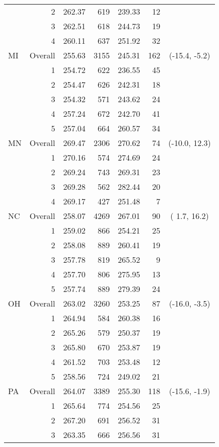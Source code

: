 \begin{longtable}{lrrr@{\extracolsep{.25cm}}rrc}
   & 2 & 262.37 & 619 & 239.33 &  12 &  \\ 
   & 3 & 262.51 & 618 & 244.73 &  19 &  \\ 
   & 4 & 260.11 & 637 & 251.92 &  32 &  \\ 
   \hline
MI & Overall & 255.63 & 3155 & 245.31 & 162 & (-15.4,  -5.2) \\ 
   & 1 & 254.72 & 622 & 236.55 &  45 &  \\ 
   & 2 & 254.47 & 626 & 242.31 &  18 &  \\ 
   & 3 & 254.32 & 571 & 243.62 &  24 &  \\ 
   & 4 & 257.24 & 672 & 242.70 &  41 &  \\ 
   & 5 & 257.04 & 664 & 260.57 &  34 &  \\ 
   \hline
MN & Overall & 269.47 & 2306 & 270.62 &  74 & (-10.0,  12.3) \\ 
   & 1 & 270.16 & 574 & 274.69 &  24 &  \\ 
   & 2 & 269.24 & 743 & 269.31 &  23 &  \\ 
   & 3 & 269.28 & 562 & 282.44 &  20 &  \\ 
   & 4 & 269.17 & 427 & 251.48 &   7 &  \\ 
   \hline
NC & Overall & 258.07 & 4269 & 267.01 &  90 & (  1.7,  16.2) \\ 
   & 1 & 259.02 & 866 & 254.21 &  25 &  \\ 
   & 2 & 258.08 & 889 & 260.41 &  19 &  \\ 
   & 3 & 257.78 & 819 & 265.52 &   9 &  \\ 
   & 4 & 257.70 & 806 & 275.95 &  13 &  \\ 
   & 5 & 257.74 & 889 & 279.39 &  24 &  \\ 
   \hline
OH & Overall & 263.02 & 3260 & 253.25 &  87 & (-16.0,  -3.5) \\ 
   & 1 & 264.94 & 584 & 260.38 &  16 &  \\ 
   & 2 & 265.26 & 579 & 250.37 &  19 &  \\ 
   & 3 & 265.80 & 670 & 253.87 &  19 &  \\ 
   & 4 & 261.52 & 703 & 253.48 &  12 &  \\ 
   & 5 & 258.56 & 724 & 249.02 &  21 &  \\ 
   \hline
PA & Overall & 264.07 & 3389 & 255.30 & 118 & (-15.6,  -1.9) \\ 
   & 1 & 265.64 & 774 & 254.56 &  25 &  \\ 
   & 2 & 267.20 & 691 & 256.52 &  31 &  \\ 
   & 3 & 263.35 & 666 & 256.56 &  31 &  \\ 

\end{longtable}
